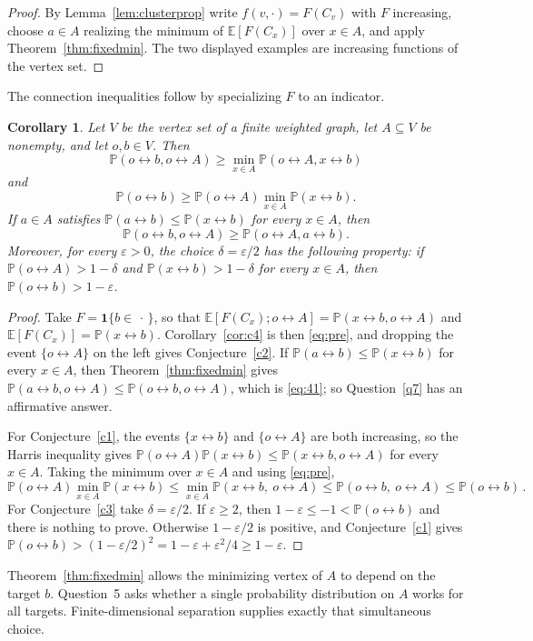 \documentclass[11pt]{article}
\newtheorem{corollary}[theorem]{Corollary}
\theoremstyle{definition}
\theoremstyle{remark}
\newcommand{\PP}{\mathbb P}
\newcommand{\EE}{\mathbb E}
\newcommand{\one}{\mathbf 1}
\newcommand{\con}{\leftrightarrow}
\begin{document}
\begin{proof}
By Lemma~\ref{lem:clusterprop} write $f(v,\cdot)=F(C_v)$ with $F$ increasing, choose $a\in
A$ realizing the minimum of $\EE[F(C_x)]$ over $x\in A$, and apply
Theorem~\ref{thm:fixedmin}. The two displayed examples are increasing functions of the
vertex set.
\end{proof}

The connection inequalities follow by specializing $F$ to an indicator.

\begin{corollary}\label{cor:c123}
Let $V$ be the vertex set of a finite weighted graph, let $A\subseteq V$ be nonempty, and
let $o,b\in V$. Then
\[
 \PP(o\con b,o\con A)\geq\min_{x\in A}\PP(o\con A,x\con b)
\]
and
\[
 \PP(o\con b)\geq\PP(o\con A)\min_{x\in A}\PP(x\con b).
\]
If $a\in A$ satisfies $\PP(a\con b)\leq\PP(x\con b)$ for every $x\in A$, then
\[
 \PP(o\con b,o\con A)\geq\PP(o\con A,a\con b).
\]
Moreover, for every $\varepsilon>0$, the choice $\delta=\varepsilon/2$ has the following
property: if $\PP(o\con A)>1-\delta$ and $\PP(x\con b)>1-\delta$ for every $x\in A$, then
$\PP(o\con b)>1-\varepsilon$.
\end{corollary}

\begin{proof}
Take $F=\one\{b\in\,\cdot\,\}$, so that $\EE[F(C_x);o\con A]=\PP(x\con b,o\con A)$ and
$\EE[F(C_x)]=\PP(x\con b)$. Corollary~\ref{cor:c4} is then \eqref{eq:pre}, and dropping the
event $\{o\con A\}$ on the left gives Conjecture~\ref{c2}. If
$\PP(a\con b)\leq\PP(x\con b)$ for every $x\in A$, then
Theorem~\ref{thm:fixedmin} gives $\PP(a\con b,o\con A)\leq\PP(o\con
b,o\con A)$, which is \eqref{eq:41}; so Question~\ref{q7} has an affirmative answer.

For Conjecture~\ref{c1}, the events $\{x\con b\}$ and $\{o\con A\}$ are both increasing, so
the Harris inequality gives $\PP(o\con A)\PP(x\con b)\leq\PP(x\con b,o\con A)$ for every
$x\in A$. Taking the minimum over $x\in A$ and using \eqref{eq:pre},
\[
 \PP(o\con A)\min_{x\in A}\PP(x\con b)\leq \min_{x\in A}\PP(x\con b,\ o\con A)
\leq \PP(o\con b,\ o\con A)\leq \PP(o\con b)\,.
\]
For Conjecture~\ref{c3} take $\delta=\varepsilon/2$. If $\varepsilon\geq2$, then
$1-\varepsilon\leq-1<\PP(o\con b)$ and there is nothing to prove. Otherwise
$1-\varepsilon/2$ is positive, and Conjecture~\ref{c1} gives $\PP(o\con
b)>(1-\varepsilon/2)^2=1-\varepsilon+\varepsilon^2/4\geq1-\varepsilon$.
\end{proof}

Theorem~\ref{thm:fixedmin} allows the minimizing vertex of $A$ to depend on the target $b$.
Question~5 asks whether a single probability distribution on $A$ works for all targets.
Finite-dimensional separation supplies exactly that simultaneous choice.
\end{document}

